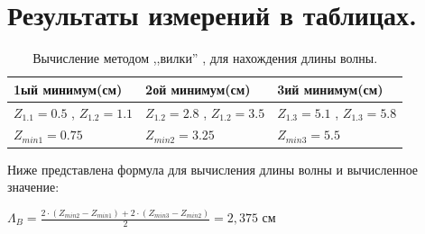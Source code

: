 \documentclass[a4paper, titlepage, 10pt]{article}
\begin{document}
\appendix
\section*{Результаты измерений в таблицах.}

\begin{table}[h!]
 \begin{center}
  \begin{tabular}{|l|l|l|}
  \hline
   1ый минимум(см)  &  2ой минимум(см)  &  3ий минимум(см)  \\
  \hline
   \( Z_{1.1} = 0.5 \) , \( Z_{1.2} = 1.1 \) & \( Z_{1.2} = 2.8 \) , \( Z_{1.2} = 3.5 \) & \( Z_{1.3} = 5.1 \) , \( Z_{1.3} = 5.8 \) \\
  \hline
  \( Z_{min1} = 0.75 \) & \( Z_{min2} = 3.25 \) & \(Z_{min3} = 5.5 \) \\
  \hline

  \end{tabular}
  \caption{Вычисление методом ,,вилки'' , для нахождения длины волны.}
 \end{center}
\end{table}

Ниже представлена формула для вычисления длины волны и вычисленное значение:
\begin{center}
\( \Lambda_{B} = \frac{2 \cdot (Z_{min2} - Z_{min1}) + 2 \cdot (Z_{min3} -Z_{min2}) }{ 2} = 2,375\) см \\[1cm]
\end{center}
\end{document}
